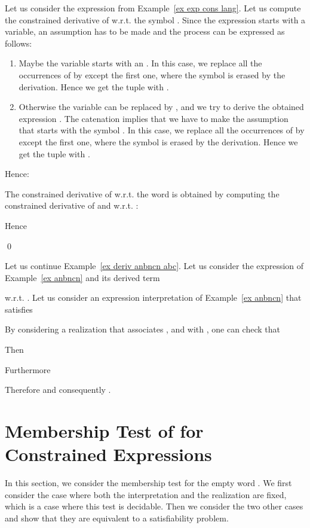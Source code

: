 \documentclass[a4paper]{llncs}
\begin{document}
  \begin{example}\label{ex derivativ}
    Let us consider the expression  from Example~\ref{ex exp cons lang}. Let us compute the constrained derivative of  w.r.t. the symbol . Since the expression starts with a variable, an assumption has to be made and the process can be expressed as follows: 
    \begin{enumerate}
      \item Maybe the variable  starts with an . In this case, we replace all the occurrences of  by  except the first one, where the symbol  is erased by the derivation. Hence we get the tuple  with .
      \item Otherwise the variable  can be replaced by , and we try to derive the obtained expression . The catenation  implies that we have to make the assumption that  starts with the symbol . In this case, we replace all the occurrences of  by  except the first one, where the symbol  is erased by the derivation. Hence we get the tuple  with .
    \end{enumerate}    
    Hence:
        
        The constrained derivative of  w.r.t. the word  is obtained by computing the constrained derivative of  and  w.r.t. :   
        
        Hence
        
    \qed
  \end{example}
  
  \begin{example}
Let us continue Example~\ref{ex deriv anbncn abc}.
    Let us consider the expression  of Example~\ref{ex anbncn} and its derived term 
    
    w.r.t. .    
      Let us consider an expression interpretation  of Example~\ref{ex anbncn} that satisfies
      
      By considering a realization  that associates ,  and  with , one can check that
      
      Then
        
       Furthermore
       
      Therefore  and consequently .       
  \end{example}
  
  \section{Membership Test of  for Constrained Expressions}\label{sec:eps membership test}
  
  In this section, we consider the membership test for the empty word . We first consider the case where both the interpretation and the realization are fixed, which is a case where this test is decidable. Then we consider the two other cases and show that they are equivalent to a satisfiability problem.
  
\end{document}
